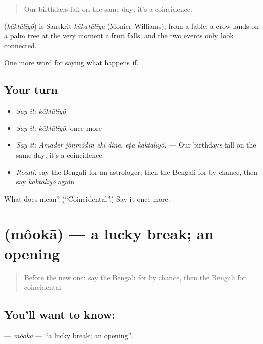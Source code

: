 \begin{quote}
Our birthdays fall on the same day; it's a coincidence.
\end{quote}

\begin{cousinweb}
\textbf{} (\emph{kāktālīyô}) is Sanskrit \emph{kākatālīya} (Monier-Williams), from a fable: a crow lands on a palm tree at the very moment a fruit falls, and the two events only look connected.
\end{cousinweb}

\begin{grammarlens}[title={What you've built}]
One more word for saying what happens if.
\end{grammarlens}

\subsection*{Your turn}
\begin{itemize}
\raggedright
  \item \emph{Say it:} \emph{kāktālīyô}
  \item \emph{Say it:} \emph{kāktālīyô}, once more
  \item \emph{Say it:} \emph{Āmāder jônmôdin eki dine, eṭā kāktālīyô.} — Our birthdays fall on the same day; it's a coincidence.
  \item \emph{Recall:} say the Bengali for an astrologer, then the Bengali for by chance, then say \emph{kāktālīyô} again
\end{itemize}

\begin{tcolorbox}[breakable,colback=teal!4,colframe=teal!35!black,title={Before you move on}]
What does  mean? (\textquotedblleft{}Coincidental\textquotedblright{}.) Say it once more.
\end{tcolorbox}
\section[\texorpdfstring{\bn{মওকা} (môokā)}{মওকা (môokā)}]{ (môokā) — a lucky break; an opening}

\label{lesson:BN-C533-mooka}



\begin{quote}
Before the new one: say the Bengali for by chance, then the Bengali for coincidental.
\end{quote}

\subsection*{You'll want to know: }
\textbf{} — \emph{môokā} — \textquotedblleft{}a lucky break; an opening\textquotedblright{}.

